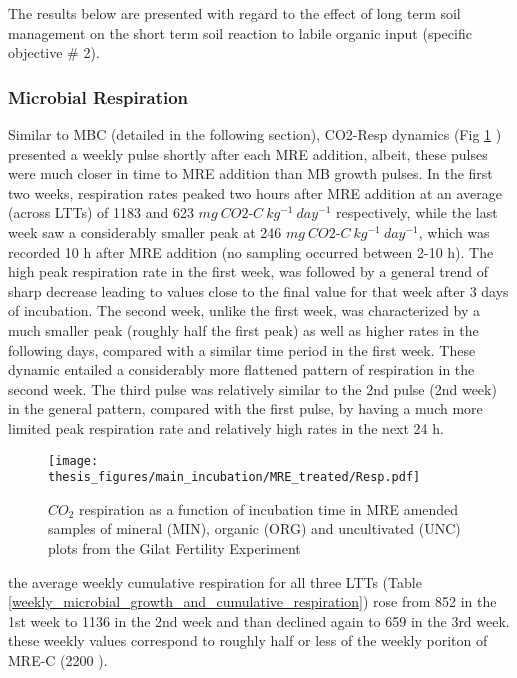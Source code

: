 \documentclass[12pt]{report}
\begin{document}
		The results below are presented with regard to the effect of long term soil management on the short term soil reaction to labile organic input (specific objective \# 2).\\
		
		
		
		\subsubsection{Microbial Respiration}
		
		Similar to MBC (detailed in the following section), CO2-Resp dynamics (Fig \ref{fig:resp_treated_main} ) presented a weekly pulse shortly after each MRE addition, albeit, these pulses were much closer in time to MRE addition than MB growth pulses. In the first two weeks, respiration rates peaked two hours after MRE addition at an average (across LTTs) of 1183 and 623 $mg\ CO2$-$C\ kg^{-1}\ day^{-1}$ respectively, while the last week saw a considerably smaller peak at 246 $mg\ CO2$-$C\ kg^{-1}\ day^{-1}$, which was recorded 10 h after MRE addition (no sampling occurred between 2-10 h).
		The high peak respiration rate in the first week, was followed by a general trend of sharp decrease leading to values close to the final value for that week after 3 days of incubation. The second week, unlike the first week, was characterized by a much smaller peak (roughly half the first peak) as well as higher rates in the following days, compared with a similar time period in the first week. These dynamic entailed a considerably more flattened pattern of respiration in the second week. The third pulse was relatively similar to the 2nd pulse (2nd week) in the general pattern, compared with the first pulse, by having a much more limited peak respiration rate and relatively high rates in the next 24 h.\\
		
		
		\begin{figure}[H]
			\centering
			\texttt{[image: thesis\_figures/main\_incubation/MRE\_treated/Resp.pdf]}
			\caption{$CO_2$ respiration as a function of incubation time in MRE amended samples of mineral (MIN), organic (ORG) and uncultivated (UNC) plots from the Gilat Fertility Experiment}
			\label{fig:resp_treated_main}
		\end{figure}
		\noindent
		the average weekly cumulative respiration for all three LTTs (Table \ref{weekly_microbial_growth_and_cumulative_respiration}) rose from 852 \cumrespunit in the 1st week to 1136 \cumrespunit in the 2nd week and than declined again to 659 \cumrespunit in the 3rd week. these weekly values correspond to roughly half or less of the weekly poriton of MRE-C (2200 \genericunit).
		
\end{document}
